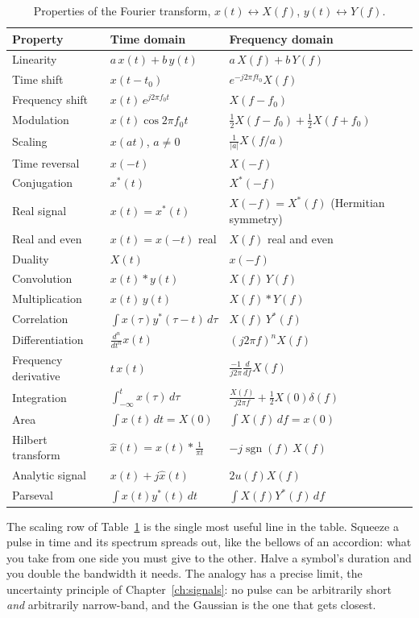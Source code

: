 \begin{table}[htbp]\centering\small
\caption{Properties of the Fourier transform, $x(t)\leftrightarrow X(f)$, $y(t)\leftrightarrow Y(f)$.}\label{tab:appA:ftprops}
\begin{tabular}{@{}lll@{}}
\toprule
Property & Time domain & Frequency domain\\
\midrule
Linearity & $a\,x(t)+b\,y(t)$ & $a\,X(f)+b\,Y(f)$\\
Time shift & $x(t-t_0)$ & $e^{-j2\pi f t_0}X(f)$\\
Frequency shift & $x(t)\,e^{j2\pi f_0t}$ & $X(f-f_0)$\\
Modulation & $x(t)\cos 2\pi f_0 t$ & $\tfrac12X(f-f_0)+\tfrac12X(f+f_0)$\\
Scaling & $x(at)$, $a\neq0$ & $\frac{1}{|a|}X(f/a)$\\
Time reversal & $x(-t)$ & $X(-f)$\\
Conjugation & $x^*(t)$ & $X^*(-f)$\\
Real signal & $x(t)=x^*(t)$ & $X(-f)=X^*(f)$ (Hermitian symmetry)\\
Real and even & $x(t)=x(-t)$ real & $X(f)$ real and even\\
Duality & $X(t)$ & $x(-f)$\\
Convolution & $x(t)*y(t)$ & $X(f)\,Y(f)$\\
Multiplication & $x(t)\,y(t)$ & $X(f)*Y(f)$\\
Correlation & $\int x(\tau)y^*(\tau-t)\,d\tau$ & $X(f)\,Y^*(f)$\\
Differentiation & $\frac{d^n}{dt^n}x(t)$ & $(j2\pi f)^nX(f)$\\
Frequency derivative & $t\,x(t)$ & $\frac{-1}{j2\pi}\frac{d}{df}X(f)$\\
Integration & $\int_{-\infty}^{t}x(\tau)\,d\tau$ & $\frac{X(f)}{j2\pi f}+\tfrac12X(0)\delta(f)$\\
Area & $\int x(t)\,dt=X(0)$ & $\int X(f)\,df=x(0)$\\
Hilbert transform & $\hat x(t)=x(t)*\frac{1}{\pi t}$ & $-j\operatorname{sgn}(f)\,X(f)$\\
Analytic signal & $x(t)+j\hat x(t)$ & $2u(f)X(f)$\\
Parseval & $\int x(t)y^*(t)\,dt$ & $\int X(f)Y^*(f)\,df$\\
\bottomrule
\end{tabular}
\end{table}

\begin{analogy}
The scaling row of Table~\ref{tab:appA:ftprops} is the single most useful line in the table.
Squeeze a pulse in time and its spectrum spreads out, like the bellows of an accordion: what you
take from one side you must give to the other. Halve a symbol's duration and you double the
bandwidth it needs. The analogy has a precise limit, the uncertainty principle of
Chapter~\ref{ch:signals}: no pulse can be arbitrarily short \emph{and} arbitrarily narrow-band,
and the Gaussian is the one that gets closest.
\end{analogy}

